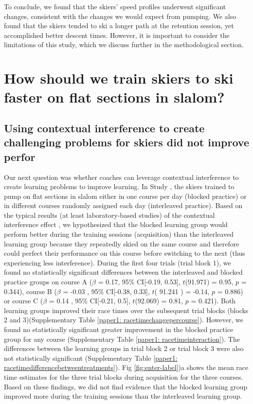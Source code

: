 To conclude, we found that the skiers' speed profiles underwent significant changes, consistent with the changes we would expect from pumping. We also found that the skiers tended to ski a longer path at the retention session, yet accomplished better descent times. However, it is important to consider the limitations of this study, which we discuss further in the methodological section. 

\section{How should we train skiers to ski faster on flat sections in slalom?}


\subsection{Using contextual interference to create challenging problems for skiers did not improve perfor}
Our next question was whether coaches can leverage contextual interference to create learning problems to improve learning. In Study , the skiers trained to pump on flat sections in slalom either in one course per day (blocked practice) or in different courses randomly assigned each day (interleaved practice). Based on the typical results (at least laboratory-based studies) of the contextual interference effect \cite{simon_metacognition_2001, shea_context_1983, hall_contextual_1994, shea_contextual_1979, tsutsui_contextual_1998, thomas_using_2021}, we hypothesized that the blocked learning group would perform better during the training sessions (acquisition) than the interleaved learning group because they repeatedly skied on the same course and therefore could perfect their performance on this course before switching to the next (thus experiencing less interference). During the first four trials (trial block 1), we found no statistically significant differences between the interleaved and blocked practice groups on course A ($\beta$ = 0.17, 95\% CI[-0.19, 0.53], $t$(91.971) = 0.95, $p$ =  0.344), course B ($\beta$ = -0.03 , 95\% CI[-0.38, 0.33], $t$( 91.241 ) = -0.14, $p$ = 0.886) or course C ($\beta$ = 0.14 , 95\% CI[-0.21, 0.5], $t$(92.069) = 0.81, $p$ = 0.421). Both learning groups improved their race times over the subsequent trial blocks (blocks 2 and 3)(Supplementary Table \ref{paper1: racetimechangepercourse}). However, we found no statistically significant greater improvement in the blocked practice group for any course (Supplementary Table \ref{paper1: racetimeinteraction}). The differences between the learning groups in trial block 2 or trial block 3 were also not statistically significant (Supplementary Table \ref{paper1: racetimedifferencebetweentreatments}). Fig \ref{fig:enter-label})a shows the mean race time estimates for the three trial blocks during acquisition for the three courses. Based on these findings, we did not find evidence that the blocked learning group improved more during the training sessions than the interleaved learning group. 

